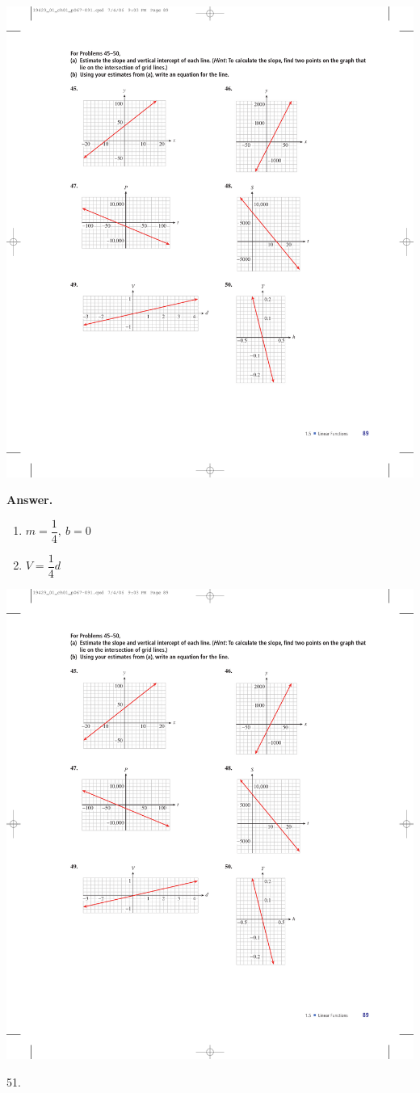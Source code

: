 \documentclass[10pt,]{book}
\theoremstyle{plain}
\theoremstyle{definition}
\theoremstyle{definition}
\theoremstyle{definition}
\theoremstyle{definition}
\numberwithin{equation}{part}
\begin{document}
\begin{exerciselist}
\begin{exercisegroup}
\exercise[49.]\hypertarget{exercise-335}{}\includegraphics[width=0.8\linewidth]{images/fig-ex-1-5-49}
%
\par\smallskip
\noindent\textbf{Answer.}\hypertarget{answer-188}{}\quad
\leavevmode%
\begin{enumerate}[label=*\alph**]
\item\hypertarget{li-1245}{}\(m = \dfrac{1}{4}, ~b = 0\)%
\item\hypertarget{li-1246}{}\(V = \dfrac{1}{4}d\)%
\end{enumerate}
%
\exercise[50.]\hypertarget{exercise-336}{}\includegraphics[width=0.4\linewidth]{images/fig-ex-1-5-50}
%
\end{exercisegroup}
\par\smallskip\noindent
\item[51.]\hypertarget{exercise-337}{}\leavevmode%

\end{exerciselist}
\end{document}
